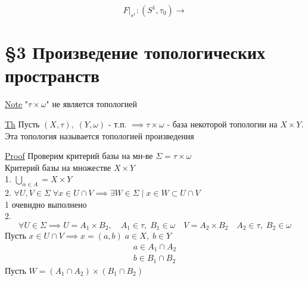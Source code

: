 \documentclass[a4paper]{article}
\begin{document}
\[
    F|_{s^{1}}: (S^{1}, \tau_{0}) \to 
\]


\section*{\centering \S 3 Произведение топологических пространств}

\underline{Note} "$ \tau \times \omega $" не является топологией

\begin{tcolorbox}
\underline{Th} Пусть $ (X,\tau), \; (Y, \omega) $ - т.п. $ \implies \tau 
\times \omega$ - база некоторой топологии на $ X \times Y $. Эта топология 
называется топологией произведения

\underline{Proof} Проверим критерий базы на мн-ве $ \Sigma = \tau \times \omega $ \\
Критерий базы на множестве $ X \times Y $ \\
1. $ \bigcup_{\alpha \in A} = X \times Y $ \\
2. $ \forall U, V \in \Sigma \; \forall x \in U \cap V \implies \exists W \in 
\Sigma \; | \; x \in W \subset U \cap V$ \\

1 очевидно выполнено\\
2. \[
    \forall U \in \Sigma \implies U = A_{1} \times B_2, \quad A_1 \in \tau, \; 
    B_1 \in \omega \quad V = A_2 \times B_2\quad A_2 \in \tau, \; 
    B_2 \in \omega
\]
Пусть $ x \in U \cap V \implies x = (a, b) \; a \in X, \; b \in Y $ 
\begin{equation*}
    \begin{aligned}
        a \in A_1 \cap A_2 \\
        b \in B_1 \cap B_2
    \end{aligned}
\end{equation*}
Пусть $ W = (A_1 \cap A_2) \times (B_1 \cap B_2) $ 
\end{tcolorbox}
\end{document}
